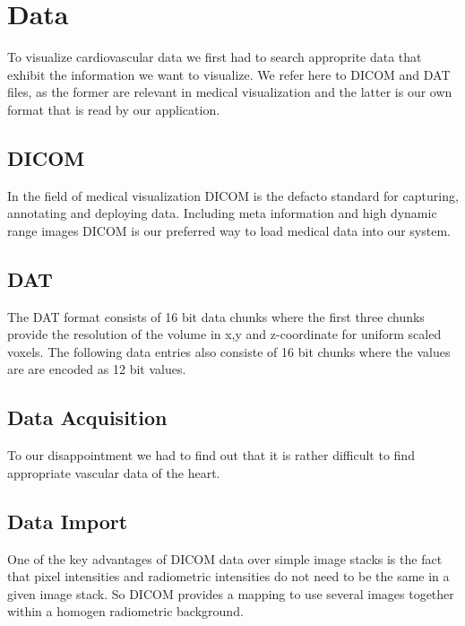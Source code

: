 \section{Data}

To visualize cardiovascular data we first had to search approprite data that exhibit the information we want to visualize. We refer here to DICOM and DAT files, as the former are relevant in medical visualization and the latter is our own format that is read by our application.

\subsection{DICOM}

In the field of medical visualization DICOM is the defacto standard for capturing, annotating and deploying data.
Including meta information and high dynamic range images DICOM is our preferred way to load medical data into our system.

\subsection{DAT}

The DAT format consists of 16 bit data chunks where the first three chunks provide the resolution of the volume in x,y and z-coordinate for uniform scaled voxels. The following data entries also consiste of 16 bit chunks where the values are are encoded as 12 bit values. 

\subsection{Data Acquisition}

To our disappointment we had to find out that it is rather difficult to find appropriate vascular data of the heart.


\subsection{Data Import}

One of the key advantages of DICOM data over simple image stacks is the fact that pixel intensities and radiometric intensities do not need to be the same in a given image stack. So DICOM provides a mapping to use several images together within a homogen radiometric background.


